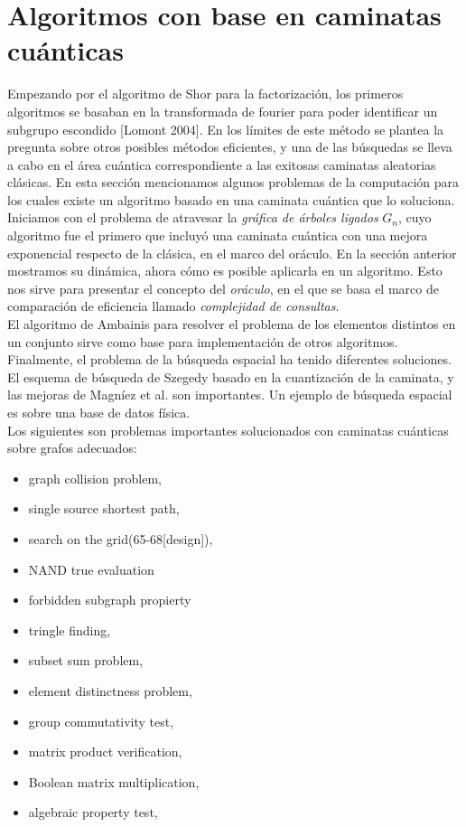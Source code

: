 \chapter{Algoritmos con base en caminatas cuánticas}
Empezando por el algoritmo de Shor para la factorización, los primeros algoritmos se basaban en la transformada de fourier para poder identificar un subgrupo escondido [Lomont 2004]. En los límites de este método se plantea la pregunta sobre otros posibles métodos eficientes, y una de las búsquedas se lleva a cabo en el área cuántica correspondiente a las  exitosas caminatas aleatorias clásicas.
En esta sección mencionamos algunos problemas de la computación para los cuales existe un algoritmo basado en una caminata cuántica que lo soluciona.\\

Iniciamos con el problema de atravesar la \textit{gráfica de árboles ligados} $G_n$, cuyo algoritmo fue el primero que incluyó una caminata cuántica con una mejora exponencial respecto de la clásica, en el marco del oráculo. En la sección anterior mostramos su dinámica, ahora cómo es posible aplicarla en un algoritmo. Esto nos sirve para presentar el concepto del \textit{oráculo}, en el que se basa el marco de comparación de eficiencia llamado \textit{complejidad de consultas}.\\

El algoritmo de Ambainis \cite{ambainis2007quantum} para resolver el problema de los elementos distintos en un conjunto sirve como base para implementación de otros algoritmos. Finalmente, el problema de la búsqueda espacial ha tenido diferentes soluciones. El esquema de búsqueda de Szegedy \cite{szegedy2004quantum} basado en la cuantización de la caminata, y las mejoras de Magníez et al. \cite{magniez2011search} son importantes. Un ejemplo de búsqueda espacial es sobre una base de datos física.\\

Los siguientes son problemas importantes solucionados con caminatas cuánticas sobre grafos adecuados:
\begin{itemize}{}
\setlength\itemsep{0.2em}
\item graph collision problem,
\item single source shortest path,
\item search on the grid(65-68[design]),
\item NAND true evaluation
\item forbidden subgraph propierty
\item tringle finding,
\item subset sum problem,
\item element distinctness problem,
\item group commutativity test,
\item matrix product verification,
\item Boolean matrix multiplication,
\item algebraic property test,
\end{itemize}{}

